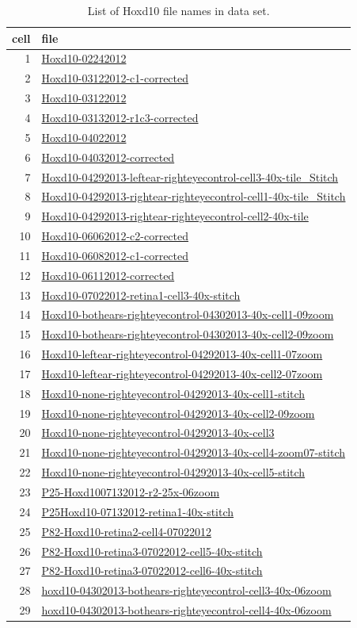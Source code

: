 \documentclass{article}
\begin{document}
\begin{table}
  \centering
  \begin{tabular}{rl}
    \toprule
    cell & file \\
    \midrule
1& \url{Hoxd10-02242012} \\
2& \url{Hoxd10-03122012-c1-corrected} \\
3& \url{Hoxd10-03122012} \\
4& \url{Hoxd10-03132012-r1c3-corrected} \\
5& \url{Hoxd10-04022012} \\
6& \url{Hoxd10-04032012-corrected} \\
7& \url{Hoxd10-04292013-leftear-righteyecontrol-cell3-40x-tile_Stitch} \\
8&
\url{Hoxd10-04292013-rightear-righteyecontrol-cell1-40x-tile_Stitch} \\
9& \url{Hoxd10-04292013-rightear-righteyecontrol-cell2-40x-tile} \\
10& \url{Hoxd10-06062012-c2-corrected} \\
11& \url{Hoxd10-06082012-c1-corrected} \\
12& \url{Hoxd10-06112012-corrected} \\
13& \url{Hoxd10-07022012-retina1-cell3-40x-stitch} \\
14& \url{Hoxd10-bothears-righteyecontrol-04302013-40x-cell1-09zoom} \\
15& \url{Hoxd10-bothears-righteyecontrol-04302013-40x-cell2-09zoom} \\
16& \url{Hoxd10-leftear-righteyecontrol-04292013-40x-cell1-07zoom} \\
17& \url{Hoxd10-leftear-righteyecontrol-04292013-40x-cell2-07zoom} \\
18& \url{Hoxd10-none-righteyecontrol-04292013-40x-cell1-stitch} \\
19& \url{Hoxd10-none-righteyecontrol-04292013-40x-cell2-09zoom} \\
20& \url{Hoxd10-none-righteyecontrol-04292013-40x-cell3} \\
21& \url{Hoxd10-none-righteyecontrol-04292013-40x-cell4-zoom07-stitch} \\
22& \url{Hoxd10-none-righteyecontrol-04292013-40x-cell5-stitch} \\
23& \url{P25-Hoxd1007132012-r2-25x-06zoom} \\
24& \url{P25Hoxd10-07132012-retina1-40x-stitch} \\
25& \url{P82-Hoxd10-retina2-cell4-07022012} \\
26& \url{P82-Hoxd10-retina3-07022012-cell5-40x-stitch} \\
27& \url{P82-Hoxd10-retina3-07022012-cell6-40x-stitch} \\
28& \url{hoxd10-04302013-bothears-righteyecontrol-cell3-40x-06zoom} \\
29& \url{hoxd10-04302013-bothears-righteyecontrol-cell4-40x-06zoom} \\
\bottomrule
  \end{tabular}
  \caption{List of Hoxd10 file names in data set.}

\end{table}
\end{document}
